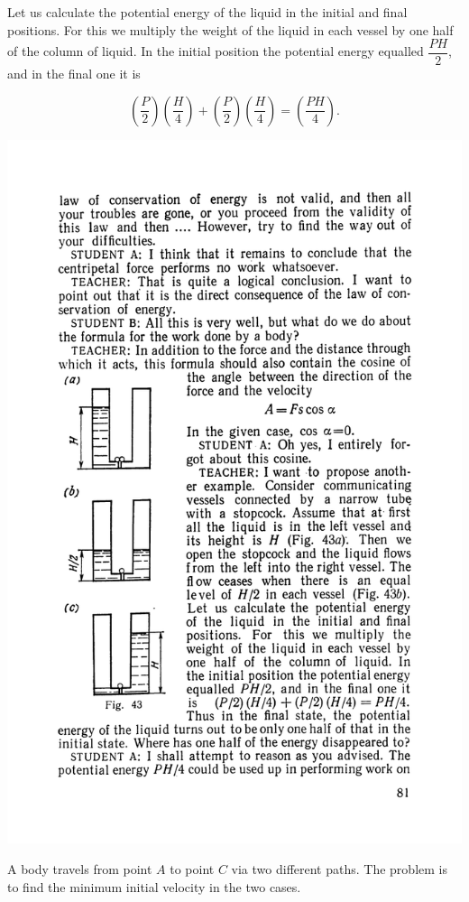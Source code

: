 \documentclass[a4paper,sfsidenotes]{tufte-book}
\begin{document}
Let us calculate the potential energy of the liquid in the initial and final positions. For this we multiply the weight of the liquid in each vessel by one half of the column of liquid. In the initial position the potential energy equalled $\dfrac{PH}{2}$, and in the final one it is 

\begin{equation*}
 \left( \frac{P}{2} \right)  \left( \frac{H}{4} \right) +  \left( \frac{P}{2} \right)   \left( \frac{H}{4} \right) =   \left( \frac{PH}{4} \right).
\end{equation*}


\begin{marginfigure}
\centering
\includegraphics[width=0.8\linewidth]{fig-043a.pdf}
\caption{A body travels from point $A$ to point $C$ via two different paths. The problem is to find the minimum initial velocity in the two cases.}
\label{fig-43}
\end{marginfigure}
\end{document}
